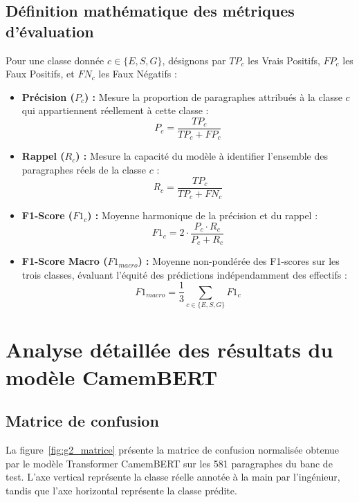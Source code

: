 \documentclass[12pt,a4paper]{report}
\begin{document}
\subsection{Définition mathématique des métriques d'évaluation}
Pour une classe donnée $c \in \{E, S, G\}$, désignons par $TP_c$ les Vrais Positifs, $FP_c$ les Faux Positifs, et $FN_c$ les Faux Négatifs :
\begin{itemize}
    \item \textbf{Précision ($P_c$) :} Mesure la proportion de paragraphes attribués à la classe $c$ qui appartiennent réellement à cette classe :
    \begin{equation}
        P_c = \frac{TP_c}{TP_c + FP_c}
    \end{equation}
    \item \textbf{Rappel ($R_c$) :} Mesure la capacité du modèle à identifier l'ensemble des paragraphes réels de la classe $c$ :
    \begin{equation}
        R_c = \frac{TP_c}{TP_c + FN_c}
    \end{equation}
    \item \textbf{F1-Score ($F1_c$) :} Moyenne harmonique de la précision et du rappel :
    \begin{equation}
        F1_c = 2 \cdot \frac{P_c \cdot R_c}{P_c + R_c}
    \end{equation}
    \item \textbf{F1-Score Macro ($F1_{macro}$) :} Moyenne non-pondérée des F1-scores sur les trois classes, évaluant l'équité des prédictions indépendamment des effectifs :
    \begin{equation}
        F1_{macro} = \frac{1}{3} \sum_{c \in \{E, S, G\}} F1_c
    \end{equation}
\end{itemize}

\section{Analyse détaillée des résultats du modèle CamemBERT}

\subsection{Matrice de confusion}
La figure~\ref{fig:g2_matrice} présente la matrice de confusion normalisée obtenue par le modèle Transformer CamemBERT sur les 581 paragraphes du banc de test. L'axe vertical représente la classe réelle annotée à la main par l'ingénieur, tandis que l'axe horizontal représente la classe prédite.
\end{document}
